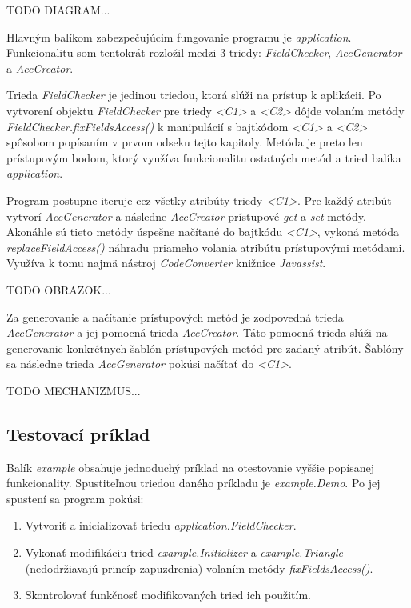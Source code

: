 \documentclass[11pt,final,oneside]{fithesis}
\begin{document}
TODO DIAGRAM...

Hlavným balíkom zabezpečujúcim fungovanie programu je \textit{application}. 
Funkcionalitu som tentokrát rozložil medzi 3 triedy: \textit{FieldChecker}, 
\textit{AccGenerator} a \textit{AccCreator}.

Trieda \textit{FieldChecker} je jedinou triedou, ktorá slúži na prístup k 
aplikácii. Po vytvorení objektu \textit{FieldChecker} pre triedy \textit{<C1>} 
a \textit{<C2>} dôjde volaním metódy \textit{FieldChecker.fixFieldsAccess()} k 
manipulácií s bajtkódom \textit{<C1>} a \textit{<C2>} spôsobom popísaním v 
prvom odseku tejto kapitoly. Metóda je preto len prístupovým bodom, ktorý 
využíva funkcionalitu ostatných metód a tried balíka \textit{application}.

Program postupne iteruje cez všetky atribúty triedy \textit{<C1>}. Pre každý 
atribút vytvorí \textit{AccGenerator} a následne \textit{AccCreator} prístupové
\textit{get} a \textit{set} metódy. Akonáhle sú tieto metódy úspešne načítané 
do bajtkódu \textit{<C1>}, vykoná metóda \textit{replaceFieldAccess()} náhradu 
priameho volania atribútu prístupovými metódami. Využíva k tomu najmä nástroj 
\textit{CodeConverter} knižnice \textit{Javassist}.

TODO OBRAZOK...

Za generovanie a načítanie prístupových metód je zodpovedná trieda 
\textit{AccGenerator} a jej pomocná trieda \textit{AccCreator}. Táto pomocná 
trieda slúži na generovanie konkrétnych šablón prístupových metód pre zadaný 
atribút. Šablóny sa následne trieda \textit{AccGenerator} pokúsi načítať do
\textit{<C1>}.

TODO MECHANIZMUS...

\subsection{Testovací príklad}
Balík \textit{example} obsahuje jednoduchý príklad na otestovanie vyššie 
popísanej funkcionality. Spustiteľnou triedou daného príkladu je 
\textit{example.Demo}. Po jej spustení sa program pokúsi:

\begin{enumerate}
\item Vytvoriť a inicializovať triedu \textit{application.FieldChecker}.
\item Vykonať modifikáciu tried \textit{example.Initializer} a 
\textit{example.Triangle} (nedodržiavajú princíp zapuzdrenia) volaním metódy 
\textit{fixFieldsAccess()}.
\item Skontrolovať funkčnosť modifikovaných tried ich použitím.
\end{enumerate}
\end{document}
